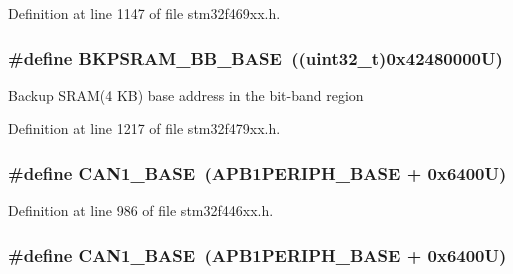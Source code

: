 Definition at line 1147 of file stm32f469xx.\+h.

\subsubsection[{\texorpdfstring{B\+K\+P\+S\+R\+A\+M\+\_\+\+B\+B\+\_\+\+B\+A\+SE}{BKPSRAM_BB_BASE}}]{\setlength{\rightskip}{0pt plus 5cm}\#define B\+K\+P\+S\+R\+A\+M\+\_\+\+B\+B\+\_\+\+B\+A\+SE~((uint32\+\_\+t)0x42480000\+U)}\hypertarget{group___peripheral__memory__map_gaee19a30c9fa326bb10b547e4eaf4e250}{}\label{group___peripheral__memory__map_gaee19a30c9fa326bb10b547e4eaf4e250}
Backup S\+R\+A\+M(4 K\+B) base address in the bit-\/band region 

Definition at line 1217 of file stm32f479xx.\+h.

\subsubsection[{\texorpdfstring{C\+A\+N1\+\_\+\+B\+A\+SE}{CAN1_BASE}}]{\setlength{\rightskip}{0pt plus 5cm}\#define C\+A\+N1\+\_\+\+B\+A\+SE~({\bf A\+P\+B1\+P\+E\+R\+I\+P\+H\+\_\+\+B\+A\+SE} + 0x6400\+U)}\hypertarget{group___peripheral__memory__map_gad8e45ea6c032d9fce1b0516fff9d8eaa}{}\label{group___peripheral__memory__map_gad8e45ea6c032d9fce1b0516fff9d8eaa}


Definition at line 986 of file stm32f446xx.\+h.

\subsubsection[{\texorpdfstring{C\+A\+N1\+\_\+\+B\+A\+SE}{CAN1_BASE}}]{\setlength{\rightskip}{0pt plus 5cm}\#define C\+A\+N1\+\_\+\+B\+A\+SE~({\bf A\+P\+B1\+P\+E\+R\+I\+P\+H\+\_\+\+B\+A\+SE} + 0x6400\+U)}\hypertarget{group___peripheral__memory__map_gad8e45ea6c032d9fce1b0516fff9d8eaa}{}\label{group___peripheral__memory__map_gad8e45ea6c032d9fce1b0516fff9d8eaa}


